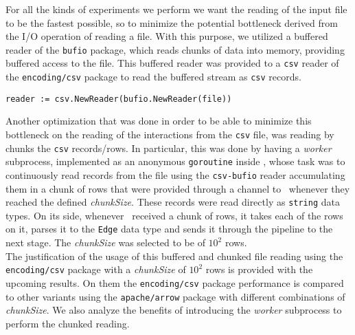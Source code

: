 For all the kinds of experiments we perform we want the reading of the input file to be the fastest possible, so to minimize the potential bottleneck derived from the I/O operation of reading a file. With this purpose, we utilized a buffered reader of the \texttt{bufio} package, which reads chunks of data into memory, providing buffered access to the file. This buffered reader was provided to a \texttt{csv} reader of the \texttt{encoding/csv} package to read the buffered stream as \texttt{csv} records.


    \begin{center}
    \lstset{style=golangStyle}
    \begin{lstlisting}[caption={\texttt{csv-bufio} reader}]
        reader := csv.NewReader(bufio.NewReader(file))
    \end{lstlisting}
    \end{center}
    
Another optimization that was done in order to be able to minimize this bottleneck on the reading of the interactions from the \texttt{csv} file, was reading by chunks the \texttt{csv} records/rows. In particular, this was done by having a \textit{worker} subprocess, implemented as an anonymous \texttt{goroutine} inside \Sr, whose task was to continuously read records from the file using the \texttt{csv-bufio} reader accumulating them in a chunk of rows that were provided through a channel to \Sr\ whenever they reached the defined \emph{chunkSize}. These records were read directly as \texttt{string} data types. On its side, whenever \Sr\ received a chunk of rows, it takes each of the rows on it, parses it to the \texttt{Edge} data type and sends it through the pipeline to the next stage. The \emph{chunkSize} was selected to be of $10^2$ rows.\\

The justification of the usage of this buffered and chunked file reading using the \texttt{encoding/csv} package with a \emph{chunkSize} of $10^2$ rows is provided with the upcoming results. On them the \texttt{encoding/csv} package performance is compared to other variants using the \texttt{apache/arrow} package with different combinations of \emph{chunkSize}. We also analyze the benefits of introducing the \textit{worker} subprocess to perform the chunked reading.\\

